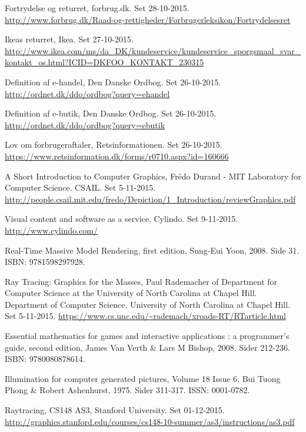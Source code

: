 \begin{thebibliography}{99}
  Fortrydelse og returret,
  forbrug.dk.
  Set 28-10-2015.
  \url{http://www.forbrug.dk/Raad-og-rettigheder/Forbrugerleksikon/Fortrydelsesret}

  Ikeas returret,
  Ikea.
  Set 27-10-2015.
  \url{http://www.ikea.com/ms/da_DK/kundeservice/kundeservice_sporgsmaal_svar_kontakt_os.html?ICID=DKFOO_KONTAKT_230315}
  
  Definition af e-handel,
  Den Danske Ordbog.
  Set 26-10-2015.
  \url{http://ordnet.dk/ddo/ordbog?query=ehandel}

  Definition af e-butik,
  Den Danske Ordbog.
  Set 26-10-2015. 
  \url{http://ordnet.dk/ddo/ordbog?query=ebutik}

  Lov om forbrugeraftaler,
  Retsinformationen.
  Set 26-10-2015.
  \url{https://www.retsinformation.dk/forms/r0710.aspx?id=160666}

  A Short Introduction to Computer Graphics,
  Frédo Durand - MIT Laboratory for Computer Science.
  CSAIL.
  Set 5-11-2015.
  \url{http://people.csail.mit.edu/fredo/Depiction/1_Introduction/reviewGraphics.pdf}
  
  Visual content and software as a service,
  Cylindo.
  Set 9-11-2015.
  \url{http://www.cylindo.com/}
  
  Real-Time Massive Model Rendering, first edition, Sung-Eui Yoon, 2008. Side 31. ISBN: 9781598297928.

  Ray Tracing: Graphics for the Masses, 
  Paul Rademacher of Department for Computer Science at the University of North Carolina at Chapel Hill.
  Department of Computer Science, University of North Carolina at Chapel Hill.
  Set 5-11-2015.
  \url{https://www.cs.unc.edu/~rademach/xroads-RT/RTarticle.html}

  Essential mathematics for games and interactive applications : a programmer's guide, second edition, James Van Verth \& Lars M   Bishop, 2008. Sider 212-236. ISBN: 9780080878614.
  
  Illumination for computer generated pictures, Volume 18 Issue 6, Bui Tuong Phong \& Robert Ashenhurst, 1975. Sider 311-317. ISSN: 0001-0782.

  Raytracing, 
  CS148 AS3, Stanford University. 
  Set 01-12-2015.
  \url{http://graphics.stanford.edu/courses/cs148-10-summer/as3/instructions/as3.pdf}


\end{thebibliography}
